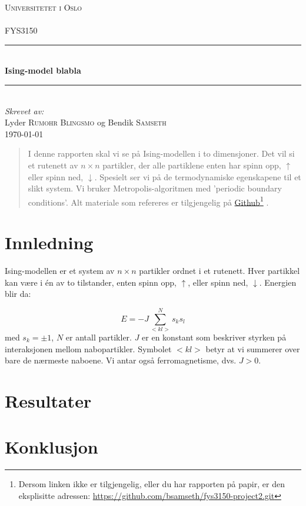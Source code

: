 \documentclass[11pt]{article}
\begin{document}
\begin{titlepage}
  \newcommand{\HRule}{\rule{\linewidth}{0.5mm}}
  \center
  \textsc{\LARGE Universitetet i Oslo}\\[1.5cm] %
  \textsc{\Large }\\[0.5cm] %
  \textsc{\large FYS3150}\\[0.5cm] %
  \HRule \\[0.4cm]
  { \huge \bfseries Ising-model blabla}\\[0.4cm]
  \HRule \\[1.5cm]
  \Large \emph{Skrevet av:}\\
  Lyder \textsc{Rumohr Blingsmo} og Bendik \textsc{Samseth}\\[3cm]
  {\large \today}\\[3cm]
  \vfill
\end{titlepage}

\begin{abstract}
I denne rapporten skal vi se på Ising-modellen i to dimensjoner. Det vil si
et rutenett av $n \times n $ partikler, der alle partiklene enten har
spinn opp, $\uparrow$ eller spinn ned, $\downarrow$. Spesielt ser vi
på de termodynamiske egenskapene til et slikt system. Vi bruker
Metropolis-algoritmen med 'periodic boundary conditions'. Alt materiale 
som refereres er tilgjengelig på \href{https://github.com/bsamseth/fys3150-project2.git}{Github}\footnote{Dersom linken ikke er tilgjengelig, eller du har rapporten på papir, er den eksplisitte adressen: 
\url{https://github.com/bsamseth/fys3150-project2.git}} . 
\end{abstract}

\section{Innledning}
Ising-modellen er et system av $n \times n$ partikler ordnet i et rutenett. 
Hver partikkel kan være i én av to tilstander, enten spinn opp, $\uparrow$,
eller spinn ned, $\downarrow$. Energien blir da: 

\begin{equation}
  E=-J\sum_{<kl>}^{N}s_ks_l
\end{equation}
med  $s_k=\pm 1$, $N$ er antall partikler.
$J$ er en konstant som beskriver styrken på interaksjonen mellom
nabopartikler. Symbolet $<kl>$ betyr at vi summerer over bare de
nærmeste naboene. Vi antar også  ferromagnetisme, dvs.  $J> 0$.



\label{sec:innledning}
\section{Resultater}
\section{Konklusjon}

\clearpage
\printbibliography
\end{document}
